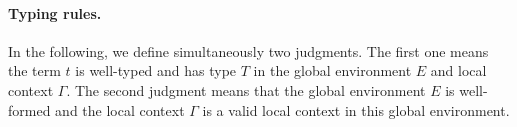 \paragraph[Typing rules.]{Typing rules.\label{Typing-rules}}
In the following, we define simultaneously two
judgments.  The first one  means the term $t$ is well-typed
and has type $T$ in the global environment $E$ and local context $\Gamma$.  The
second judgment \WFE{\Gamma} means that the global environment $E$ is
well-formed and the local context $\Gamma$ is a valid local context in this
global environment.
%

